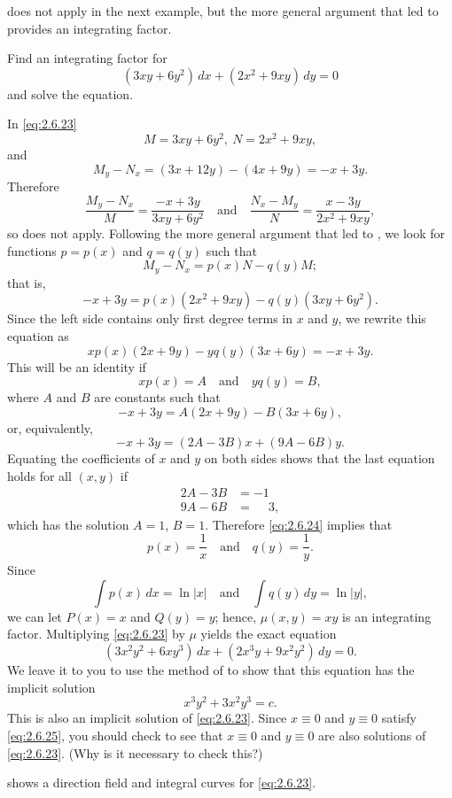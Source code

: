  does not apply in the next example,
but the more general argument that led to 
provides an integrating factor.

\begin{example}\label{example:2.6.3}
Find an integrating factor for
\begin{equation}\label{eq:2.6.23}
(3xy+6y^2)\,dx+(2x^2+9xy)\,dy=0
\end{equation} and solve the equation.
 \end{example}

\begin{solution}
In \eqref{eq:2.6.23}
 \[
 M=3xy+6y^2,\ N=2x^2+9xy,
 \]
and
 \[
M_y-N_x=(3x+12y)-(4x+9y)=-x+3y.
\]
 Therefore
 \[ \frac{M_y-N_x}{M}=\frac{-x+3y}{3xy+6y^2} \quad\text{and}\quad  \frac{N_x-M_y}{N}=\frac{x-3y}{2x^2+9xy},
 \]
so  does not apply.
Following the more general argument that led to
, we look for functions $p=p(x)$ and $q=q(y)$
such that
\[
M_y-N_x=p(x)N-q(y)M;
 \]
 that is,
\[
-x+3y=p(x)(2x^2+9xy)-q(y)(3xy+6y^2).
\]
Since the left side contains
only first degree terms in $x$ and $y$, we rewrite this equation as
\[
xp(x)(2x+9y)-yq(y)(3x+6y)=-x+3y.
 \]
 This will be an identity if
\begin{equation}\label{eq:2.6.24}
 xp(x)=A\quad\text{and}\quad yq(y)=B,
\end{equation}
 where $A$ and $B$ are constants such that
\[
-x+3y=A(2x+9y)-B(3x+6y),
 \]
 or, equivalently,
\[
-x+3y=(2A-3B)x+(9A-6B)y.
\]
Equating the coefficients of $x$ and $y$
on both sides shows that the last equation holds for all $(x,y)$ if
\begin{align*}
2A-3B &=-1 \\
9A-6B &=\phantom{-}3,
\end{align*}
 which has the solution $A=1$, $B=1$. Therefore
\eqref{eq:2.6.24} implies that
 \[
 p(x)=\frac{1}{x}\quad\text{and}\quad
q(y)=\frac{1}{y}.
\]
Since
\[
\int p(x)\,dx=\ln|x|\quad\text{and}\quad\int q(y)\,dy=\ln|y|,
\]
 we can let $P(x)=x$ and $Q(y)=y$;
hence, $\mu(x,y)=xy$ is an integrating factor. Multiplying
\eqref{eq:2.6.23} by $\mu$ yields the exact equation
\[
(3x^2y^2+6xy^3)\,dx+(2x^3y+9x^2y^2)\,dy=0.
 \]
 We leave it to you to
use the method of  to show that this equation has the
implicit solution
\begin{equation}
 \label{eq:2.6.25} x^3y^2+3x^2y^3=c.
\end{equation}
This is also an implicit solution of \eqref{eq:2.6.23}.
Since $x\equiv0$ and $y\equiv0$ satisfy \eqref{eq:2.6.25}, you should
check to see that $x\equiv0$ and $y\equiv0$ are also solutions of
\eqref{eq:2.6.23}. (Why is it necessary to check this?)

 shows a direction field and integral curves for
\eqref{eq:2.6.23}.
\end{solution}

